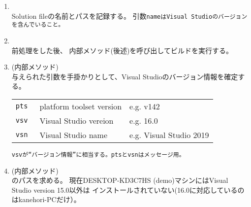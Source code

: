 \begin{enumerate}
  \item	{}\\
	Solution fileの名前とパスを記録する。
	引数\tt{name}はVisual Studioのバージョンを含んでいること。
	
  \item	{}\\
	前処理をした後、
	内部メソッド(後述)を呼び出してビルドを実行する。
	
  \item	{} ({\small 内部メソッド})\\
	与えられた引数を手掛かりとして、Visual Studioのバージョン情報を確定する。
	\begin{narrow}
	\begin{tabular}{lll}
	    \tt{pts} & platform toolset version	& e.g. v142\\
	    \tt{vsv} & Visual Studio vereion	& e.g. 16.0\\
	    \tt{vsn} & Visual Studio name	& e.g. Visual Studio 2019\\
	\end{tabular}
	\end{narrow}

	\tt{vsv}が“バージョン情報”に相当する。\tt{pts}と\tt{vsn}はメッセージ用。\\

  \item	{} ({\small 内部メソッド})\\
	のパスを求める。
	現在DESKTOP-KD3C7HS (demo)マシンにはVisual Studio version 15.0以外は
	インストールされていない(16.0に対応しているのはkanehori-PCだけ）。\\

\end{enumerate}

